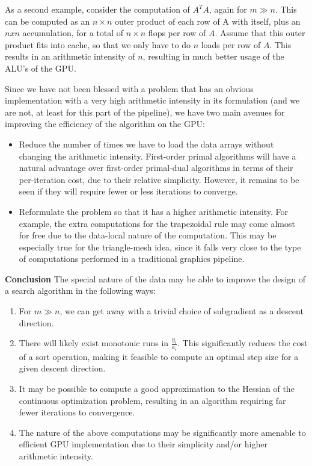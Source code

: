 \documentclass[12pt,journal,draftcls,letterpaper,onecolumn]{IEEEtran}
\begin{document}
As a second example, consider the computation of $A^T A$, again for $m \gg n$.  This can be computed as an $n \times n$ outer product of each row of A with itself, plus an $n x n$ accumulation, for a total of $n \times n$ flops per row of $A$.  Assume that this outer product fits into cache, so that we only have to do $n$ loads per row of $A$.  This results in an arithmetic intensity of $n$, resulting in much better usage of the ALU's of the GPU.

Since we have not been blessed with a problem that has an obvious implementation with a very high arithmetic intensity in its formulation (and we are not, at least for this part of the pipeline), we have two main avenues for improving the efficiency of the algorithm on the GPU:
\begin{itemize}
\item Reduce the number of times we have to load the data arrays without changing the arithmetic intensity.  First-order primal algorithms will have a natural advantage over first-order primal-dual algorithms in terms of their per-iteration cost, due to their relative simplicity.  However, it remains to be seen if they will require fewer or less iterations to converge.
\item Reformulate the problem so that it has a higher arithmetic intensity.  For example, the extra computations for the trapezoidal rule may come almost for free due to the data-local nature of the computation.  This may be especially true for the triangle-mesh idea, since it falls very close to the type of computations performed in a traditional graphics pipeline.
\end{itemize}

{\bf Conclusion } The special nature of the data may be able to improve the design of a search algorithm in the following ways:
\begin{enumerate}
\item For $m \gg n$, we can get away with a trivial choice of subgradient as a descent direction.
\item There will likely exist monotonic runs in $\frac{y_i}{a_i}$.  This significantly reduces the cost of a sort operation, making it feasible to compute an optimal step size for a given descent direction.  
\item It may be possible to compute a good approximation to the Hessian of the continuous optimization problem, resulting in an algorithm requiring far fewer iterations to convergence.  
\item The nature of the above computations may be significantly more amenable to efficient GPU implementation due to their simplicity and/or higher arithmetic intensity.
\end{enumerate}
\end{document}
